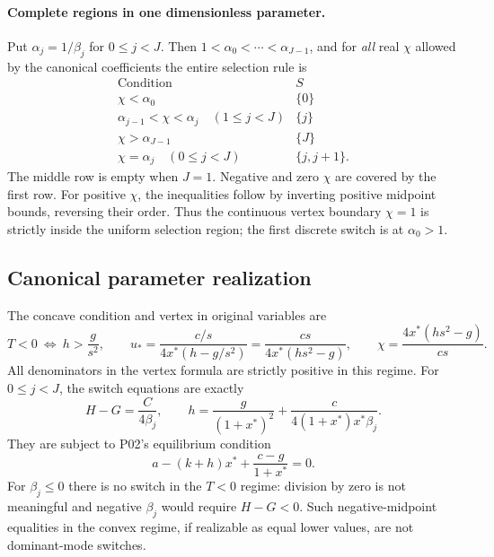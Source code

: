 \documentclass[11pt]{article}
\theoremstyle{definition}
\theoremstyle{remark}
\begin{document}
\paragraph{Complete regions in one dimensionless parameter.}
Put $\alpha_j=1/\beta_j$ for $0\le j<J$. Then
$1<\alpha_0<\cdots<\alpha_{J-1}$, and for \emph{all} real $\chi$
allowed by the canonical coefficients the entire selection rule is
\begin{equation}
 \begin{array}{c|c}
 \text{Condition}&S\\\hline
 \chi<\alpha_0&\{0\}\\
 \alpha_{j-1}<\chi<\alpha_j\quad(1\le j<J)&\{j\}\\
 \chi>\alpha_{J-1}&\{J\}\\
 \chi=\alpha_j\quad(0\le j<J)&\{j,j+1\}.
 \end{array}
 \label{eq:P05-regions}
\end{equation}
The middle row is empty when $J=1$. Negative and zero $\chi$ are covered
by the first row. For positive $\chi$, the inequalities follow by inverting
positive midpoint bounds, reversing their order. Thus the continuous
vertex boundary $\chi=1$ is strictly inside the uniform selection region;
the first discrete switch is at $\alpha_0>1$.

\subsection{Canonical parameter realization}

The concave condition and vertex in original variables are
\begin{equation}
 T<0\ \Longleftrightarrow\ h>\frac{g}{s^2},\qquad
 u_*=\frac{c/s}{4x^*(h-g/s^2)}
     =\frac{cs}{4x^*(hs^2-g)},\qquad
 \chi=\frac{4x^*(hs^2-g)}{cs}.
 \label{eq:P05-canonical-control}
\end{equation}
All denominators in the vertex formula are strictly positive in this
regime. For $0\le j<J$, the switch equations are exactly
\begin{equation}
 H-G=\frac{C}{4\beta_j},\qquad
 \boxed{h=\frac{g}{(1+x^*)^2}
       +\frac{c}{4(1+x^*)x^*\beta_j}.}
 \label{eq:P05-switch}
\end{equation}
They are subject to P02's equilibrium condition
\begin{equation}
 a-(k+h)x^*+\frac{c-g}{1+x^*}=0.
 \label{eq:P05-equilibrium}
\end{equation}
For $\beta_j\le0$ there is no switch in the $T<0$ regime: division
by zero is not meaningful and negative $\beta_j$ would require
$H-G<0$. Such negative-midpoint equalities in the convex regime, if
realizable as equal lower values, are not dominant-mode switches.
\end{document}
